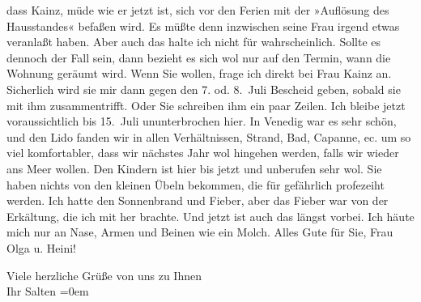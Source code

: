                dass Kainz, müde wie er jetzt ist, sich vor
               den Ferien mit der »Auflösung des Hausstandes« befaßen wird. Es müßte denn inzwischen
               seine Frau irgend etwas
               veranlaßt haben. Aber auch das halte ich nicht für wahrscheinlich. Sollte es dennoch
               der Fall sein, dann bezieht es sich wol nur auf den Termin, wann die Wohnung geräumt
               wird. Wenn Sie wollen, frage ich direkt bei Frau Kainz an. Sicherlich wird sie mir dann gegen den 7. od. 8. Juli Bescheid geben, sobald sie
               mit ihm zusammentrifft. Oder Sie schreiben ihm ein paar Zeilen. Ich bleibe jetzt
               voraussichtlich bis 15. Juli ununterbrochen hier. In Venedig war es sehr schön, und den Lido fanden wir in allen Verhältnissen, Strand, Bad, Capanne,
               ec. um so viel komfortabler, dass wir nächstes Jahr wol hingehen werden, falls wir
               wieder ans Meer wollen. Den Kindern ist hier bis jetzt und unberufen sehr wol. Sie
               haben nichts von den kleinen Übeln bekommen, die für gefährlich profezeiht werden.
               Ich hatte den Sonnenbrand und Fieber, aber das Fieber war von der Erkältung, die ich
               mit her brachte. Und jetzt ist auch das längst vorbei. Ich häute mich nur an Nase,
               Armen und Beinen wie ein Molch. Alles Gute für Sie, Frau Olga u. Heini!\pend
           
\pstart
           Viele herzliche Grüße von uns zu Ihnen {\\[\baselineskip]}Ihr \spacefill\mbox{Salten}\pend
           \leftskip=0em{}\endnumbering{}  
      